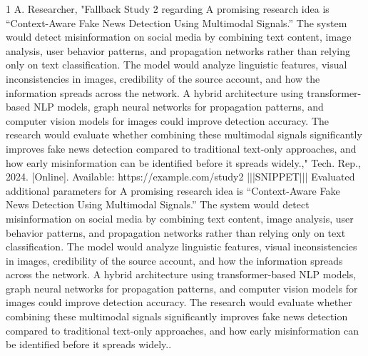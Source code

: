 \documentclass[conference]{IEEEtran}
\begin{document}
\begin{thebibliography}{1}
A. Researcher, "Fallback Study 2 regarding A promising research idea is “Context-Aware Fake News Detection Using Multimodal Signals.” The system would detect misinformation on social media by combining text content, image analysis, user behavior patterns, and propagation networks rather than relying only on text classification. The model would analyze linguistic features, visual inconsistencies in images, credibility of the source account, and how the information spreads across the network. A hybrid architecture using transformer-based NLP models, graph neural networks for propagation patterns, and computer vision models for images could improve detection accuracy. The research would evaluate whether combining these multimodal signals significantly improves fake news detection compared to traditional text-only approaches, and how early misinformation can be identified before it spreads widely.," Tech. Rep., 2024. [Online]. Available: https://example.com/study2 |||SNIPPET||| Evaluated additional parameters for A promising research idea is “Context-Aware Fake News Detection Using Multimodal Signals.” The system would detect misinformation on social media by combining text content, image analysis, user behavior patterns, and propagation networks rather than relying only on text classification. The model would analyze linguistic features, visual inconsistencies in images, credibility of the source account, and how the information spreads across the network. A hybrid architecture using transformer-based NLP models, graph neural networks for propagation patterns, and computer vision models for images could improve detection accuracy. The research would evaluate whether combining these multimodal signals significantly improves fake news detection compared to traditional text-only approaches, and how early misinformation can be identified before it spreads widely..

\end{thebibliography}
\end{document}
